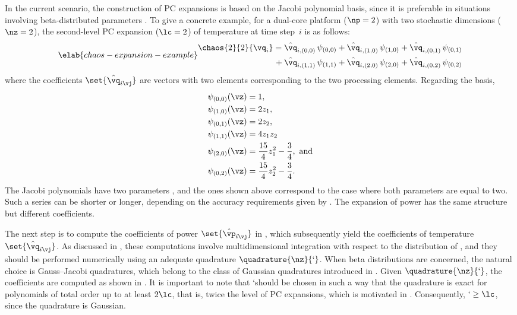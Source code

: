 In the current scenario, the construction of \ac{PC} expansions is based on the
Jacobi polynomial basis, since it is preferable in situations involving
beta-distributed parameters \cite{xiu2010}. To give a concrete example, for a
dual-core platform ($\np = 2$) with two stochastic dimensions ($\nz = 2$), the
second-level \ac{PC} expansion ($\lc = 2$) of temperature at time step~$i$ is as
follows:
\begin{equation} \elab{chaos-expansion-example}
  \begin{split}
    \chaos{2}{2}{\vq_i}
    =    {} & \hat{\vq}_{i, (0, 0)} \, \psi_{(0, 0)} +
              \hat{\vq}_{i, (1, 0)} \, \psi_{(1, 0)} +
              \hat{\vq}_{i, (0, 1)} \, \psi_{(0, 1)} \\
    {} + {} & \hat{\vq}_{i, (1, 1)} \, \psi_{(1, 1)} +
              \hat{\vq}_{i, (2, 0)} \, \psi_{(2, 0)} +
              \hat{\vq}_{i, (0, 2)} \, \psi_{(0, 2)}
  \end{split}
\end{equation}
where the coefficients $\set{\hat{\vq}_{i \vj}}$ are vectors with two elements
corresponding to the two processing elements. Regarding the basis,
\begin{align*}
  & \psi_{(0, 0)}(\vz) = 1, \\
  & \psi_{(1, 0)}(\vz) = 2 z_1, \\
  & \psi_{(0, 1)}(\vz) = 2 z_2, \\
  & \psi_{(1, 1)}(\vz) = 4 z_1 z_2 \\
  & \psi_{(2, 0)}(\vz) = \frac{15}{4} z_1^2 - \frac{3}{4}, \text{ and} \\
  & \psi_{(0, 2)}(\vz) = \frac{15}{4} z_2^2 - \frac{3}{4}.
\end{align*}
The Jacobi polynomials have two parameters \cite{xiu2010}, and the ones shown
above correspond to the case where both parameters are equal to two. Such a
series can be shorter or longer, depending on the accuracy requirements given by
\lc. The expansion of power has the same structure but different coefficients.

The next step is to compute the coefficients of power $\set{\hat{\vp}_{i \vj}}$
in , which subsequently yield the coefficients of
temperature $\set{\hat{\vq}_{i \vj}}$. As discussed in
, these computations involve multidimensional
integration with respect to the distribution of \vz, and they should be
performed numerically using an adequate quadrature $\quadrature{\nz}{\lq}$. When
beta distributions are concerned, the natural choice is Gauss--Jacobi
quadratures, which belong to the class of Gaussian quadratures introduced in
. Given $\quadrature{\nz}{\lq}$, the coefficients
are computed as shown in . It is important to note that
\lq should be chosen in such a way that the quadrature is exact for polynomials
of total order up to at least $2 \lc$, that is, twice the level of \ac{PC}
expansions, which is motivated in . Consequently, $\lq
\geq \lc$, since the quadrature is Gaussian.

